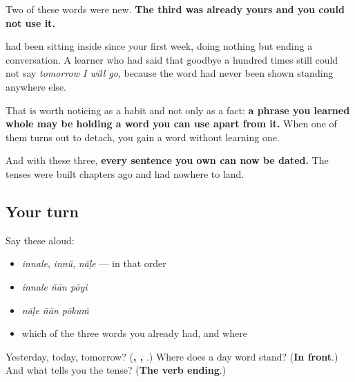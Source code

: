 \begin{grammarlens}[title={What you've built}]
Two of these words were new. \textbf{The third was already yours and you could not use it.}

\textbf{} had been sitting inside \textbf{ } since your first week, doing nothing but ending a conversation. A learner who had said that goodbye a hundred times still could not say \emph{tomorrow I will go}, because the word had never been shown standing anywhere else.

That is worth noticing as a habit and not only as a fact: \textbf{a phrase you learned whole may be holding a word you can use apart from it.} When one of them turns out to detach, you gain a word without learning one.

And with these three, \textbf{every sentence you own can now be dated.} The tenses were built chapters ago and had nowhere to land.
\end{grammarlens}

\subsection*{Your turn}
Say these aloud:

\begin{itemize}
\raggedright
  \item \emph{innale}, \emph{innŭ}, \emph{nāḷe} — in that order
  \item \emph{innale ñān pōyi}
  \item \emph{nāḷe ñān pōkuṁ}
  \item which of the three words you already had, and where
\end{itemize}

\begin{tcolorbox}[breakable,colback=teal!4,colframe=teal!35!black,title={Before you move on}]
Yesterday, today, tomorrow? (\textbf{, , }.) Where does a day word stand? (\textbf{In front}.) And what tells you the tense? (\textbf{The verb ending}.)
\end{tcolorbox}
